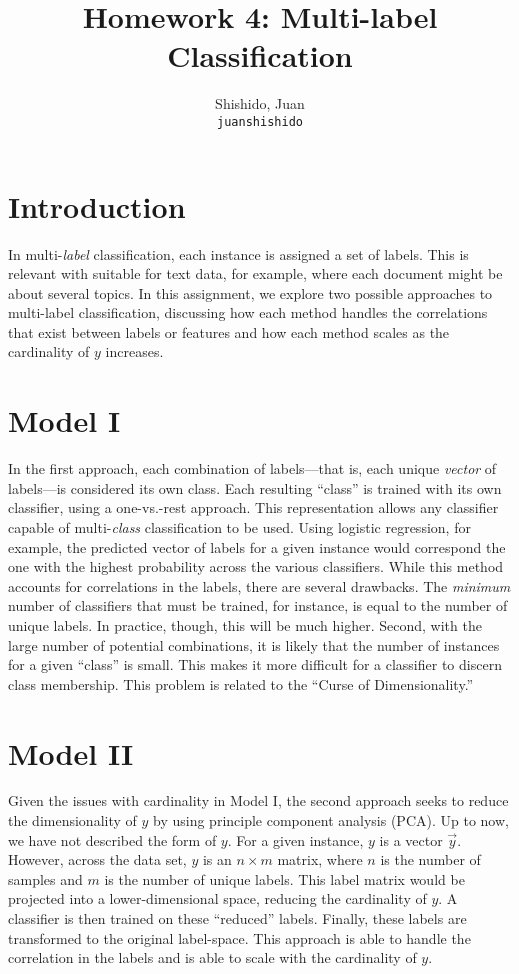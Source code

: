\documentclass[11pt]{article}
\title{Homework 4: Multi-label Classification}
\author{
  Shishido, Juan\\
  \texttt{juanshishido}
}
\begin{document}
\maketitle

\section{Introduction}

In multi-\textit{label} classification, each instance is assigned a set of
labels. This is relevant with suitable for text data, for example, where each
document might be about several topics. In this assignment, we explore two
possible approaches to multi-label classification, discussing how each method
handles the correlations that exist between labels or features and how each
method scales as the cardinality of $y$ increases.

\section{Model I}

In the first approach, each combination of labels---that is, each unique
\textit{vector} of labels---is considered its own class. Each resulting
``class'' is trained with its own classifier, using a one-vs.-rest approach.
This representation allows any classifier capable of multi-\textit{class}
classification to be used. Using logistic regression, for example, the
predicted vector of labels for a given instance would correspond the one with
the highest probability across the various classifiers. While this method
accounts for correlations in the labels, there are several drawbacks. The
\textit{minimum} number of classifiers that must be trained, for instance, is
equal to the number of unique labels. In practice, though, this will be much
higher. Second, with the large number of potential combinations, it is likely
that the number of instances for a given ``class'' is small. This makes it more
difficult for a classifier to discern class membership. This problem is related
to the ``Curse of Dimensionality.''

\section{Model II}

Given the issues with cardinality in Model I, the second approach seeks to
reduce the dimensionality of $y$ by using principle component analysis (PCA).
Up to now, we have not described the form of $y$. For a given instance, $y$ is
a vector $\vec{y}$. However, across the data set, $y$ is an $n \times m$ matrix,
where $n$ is the number of samples and $m$ is the number of unique labels. This
label matrix would be projected into a lower-dimensional space, reducing the
cardinality of $y$. A classifier is then trained on these ``reduced'' labels.
Finally, these labels are transformed to the original label-space. This
approach is able to handle the correlation in the labels and is able to scale
with the cardinality of $y$.
\end{document}
